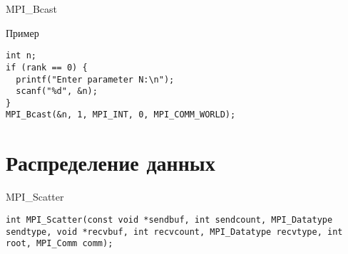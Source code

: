 \begin{frame}{MPI_Bcast}
\begin{figure}
\end{figure}

\end{frame}

\begin{frame}[fragile]{Пример}

\begin{lstlisting}
int n;
if (rank == 0) {
  printf("Enter parameter N:\n");
  scanf("%d", &n);
}
MPI_Bcast(&n, 1, MPI_INT, 0, MPI_COMM_WORLD);
\end{lstlisting}

\end{frame}

\section{Распределение данных}

\begin{frame}[fragile]{MPI_Scatter}

\begin{lstlisting}
int MPI_Scatter(const void *sendbuf, int sendcount, MPI_Datatype sendtype, void *recvbuf, int recvcount, MPI_Datatype recvtype, int root, MPI_Comm comm);
\end{lstlisting}

\end{frame}

